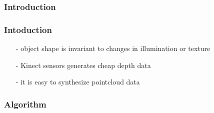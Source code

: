 \documentclass[xcolor=dvipsnames]{beamer}
\begin{document}
\subsubsection{Introduction}
\begin{frame}
	\frametitle{Intoduction}
	\Large
	\begin{itemize}
		\item[-] object shape is invariant to changes in illumination or texture
		\item[-] Kinect sensors generates cheap depth data
		\item[-] it is easy to synthesize pointcloud data
	\end{itemize}
\end{frame}

\subsubsection{Algorithm}
\end{document}
